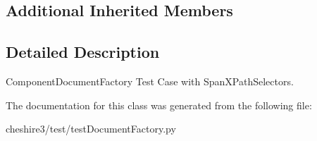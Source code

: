 \subsection*{Additional Inherited Members}


\subsection{Detailed Description}
\begin{DoxyVerb}ComponentDocumentFactory Test Case with SpanXPathSelectors.\end{DoxyVerb}
 

The documentation for this class was generated from the following file\-:\begin{DoxyCompactItemize}
\item 
cheshire3/test/test\-Document\-Factory.\-py\end{DoxyCompactItemize}
